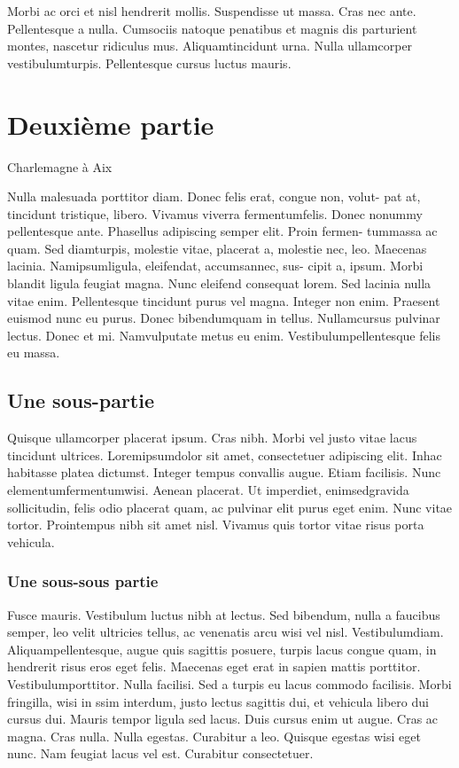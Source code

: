 \documentclass{book}
\begin{document}
 Morbi ac orci et nisl hendrerit mollis. Suspendisse ut massa. Cras nec ante. Pellentesque a nulla. Cumsociis
natoque penatibus et magnis dis parturient montes, nascetur ridiculus mus.
Aliquamtincidunt urna. Nulla ullamcorper vestibulumturpis. Pellentesque
cursus luctus mauris.

\section{Deuxième partie}

Charlemagne à Aix
\medskip

Nulla malesuada porttitor diam. Donec felis erat, congue non, volut-
pat at, tincidunt tristique, libero. Vivamus viverra fermentumfelis. Donec
nonummy pellentesque ante. Phasellus adipiscing semper elit. Proin fermen-
tummassa ac quam. Sed diamturpis, molestie vitae, placerat a, molestie
nec, leo. Maecenas lacinia. Namipsumligula, eleifendat, accumsannec, sus-
cipit a, ipsum. Morbi blandit ligula feugiat magna. Nunc eleifend consequat
lorem. Sed lacinia nulla vitae enim. Pellentesque tincidunt purus vel magna.
Integer non enim. Praesent euismod nunc eu purus. Donec bibendumquam
in tellus. Nullamcursus pulvinar lectus. Donec et mi. Namvulputate metus
eu enim. Vestibulumpellentesque felis eu massa.

\subsection{Une sous-partie}
Quisque ullamcorper placerat ipsum. Cras nibh. Morbi vel justo vitae
lacus tincidunt ultrices. Loremipsumdolor sit amet, consectetuer adipiscing
elit. Inhac habitasse platea dictumst. Integer tempus convallis augue. Etiam
facilisis. Nunc elementumfermentumwisi. Aenean placerat. Ut imperdiet,
enimsedgravida sollicitudin, felis odio placerat quam, ac pulvinar elit purus
eget enim. Nunc vitae tortor. Prointempus nibh sit amet nisl. Vivamus quis
tortor vitae risus porta vehicula.

\subsubsection{Une sous-sous partie}
Fusce mauris. Vestibulum luctus nibh at lectus. Sed bibendum, nulla
a faucibus semper, leo velit ultricies tellus, ac venenatis arcu wisi vel nisl.
Vestibulumdiam. Aliquampellentesque, augue quis sagittis posuere, turpis
lacus congue quam, in hendrerit risus eros eget felis. Maecenas eget erat in
sapien mattis porttitor. Vestibulumporttitor. Nulla facilisi. Sed a turpis eu
lacus commodo facilisis. Morbi fringilla, wisi in ssim interdum, justo
lectus sagittis dui, et vehicula libero dui cursus dui. Mauris tempor ligula
sed lacus. Duis cursus enim ut augue. Cras ac magna. Cras nulla. Nulla
egestas. Curabitur a leo. Quisque egestas wisi eget nunc. Nam feugiat lacus
vel est. Curabitur consectetuer.
\end{document}
